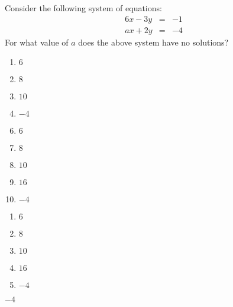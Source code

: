 


  Consider the following system of equations:
\[\begin{array}{lcl}
6x - 3y &=& -1\\
ax + 2y &=& -4
\end{array}
\]
For what value of $a$ does the above system have no solutions?


\ifsat
	\begin{enumerate}[label=\Alph*)]
		\item   $6$
		\item  $8$
		\item  $10$
		\item  $-4$%
	\end{enumerate}
\else
\fi

\ifacteven
	\begin{enumerate}[label=\textbf{\Alph*.},itemsep=\fill,align=left]
		\setcounter{enumii}{5}
		\item   $6$
		\item  $8$
		\item  $10$
		\addtocounter{enumii}{1}
		\item  $16$
		\item  $-4$%
	\end{enumerate}
\else
\fi

\ifactodd
	\begin{enumerate}[label=\textbf{\Alph*.},itemsep=\fill,align=left]
		\item   $6$
		\item  $8$
		\item  $10$
		\item  $16$
		\item  $-4$%
	\end{enumerate}
\else
\fi

\ifgridin
  $-4$%

\else
\fi

